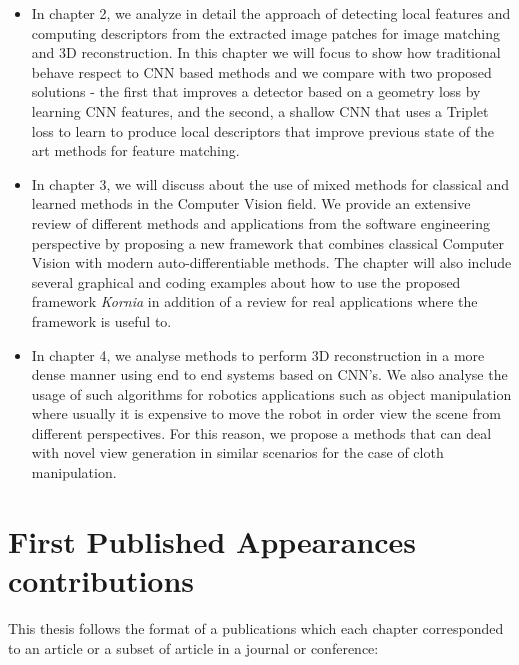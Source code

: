\begin{itemize}
    \item In chapter 2, we analyze in detail the approach of detecting local features and computing descriptors from the extracted image patches for image matching and 3D reconstruction. In this chapter we will focus to show how traditional behave respect to CNN based methods and we compare with two proposed solutions - the first that improves a detector based on a geometry loss by learning CNN features, and the second, a shallow CNN that uses a Triplet loss to learn to produce local descriptors that improve previous state of the art methods for feature matching.
    
    \item In chapter 3, we will discuss about the use of mixed methods for classical and learned methods in the Computer Vision field. We provide an extensive review of different methods and applications from the software engineering perspective by proposing a new framework that combines classical Computer Vision with modern auto-differentiable methods. The chapter will also include several graphical and coding examples about how to use the proposed framework \textit{Kornia} in addition of a review for real applications where the framework is useful to.
    
    \item In chapter 4, we analyse methods to perform 3D reconstruction in a more dense manner using end to end systems based on CNN's. We also analyse the usage of such algorithms for robotics applications such as object manipulation where usually it is expensive to move the robot in order view the scene from different perspectives. For this reason, we propose a methods that can deal with novel view generation in similar scenarios for the case of cloth manipulation.
    
    
\end{itemize}

\section{First Published Appearances contributions}

This thesis follows the format of a publications which each chapter corresponded to an article or a subset of article in a journal or conference:

